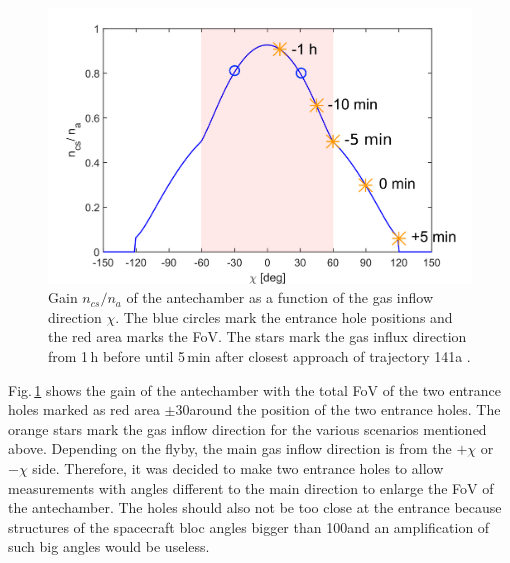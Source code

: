 	\begin{figure}[h!]
		\centering
		\includegraphics[width=.8\textwidth]{Bilder/Chi_theta0_flyby.png}
		\caption{Gain $n_{cs}/n_a$ of the antechamber as a function of the gas inflow direction $\chi$. The blue circles mark the entrance hole positions and the red area marks the FoV. The stars mark the gas influx direction from 1\,h before until 5\,min after closest approach of trajectory 141a \cite{SOC_Crema3p2}.}
		\label{fig:densEnhChiFlyby}
	\end{figure}
	Fig.\,\ref{fig:densEnhChiFlyby} shows the gain of the antechamber with the total FoV of the two entrance holes marked as red area $\pm$30\degree around the position of the two entrance holes. The orange stars mark the gas inflow direction for the various scenarios mentioned above. Depending on the flyby, the main gas inflow direction is from the $+\chi$ or $-\chi$ side. Therefore, it was decided to make two entrance holes to allow measurements with angles different to the main direction to enlarge the FoV of the antechamber. The holes should also not be too close at the entrance because structures of the spacecraft bloc angles bigger than 100\degree and an amplification of such big angles would be useless.
	
	
